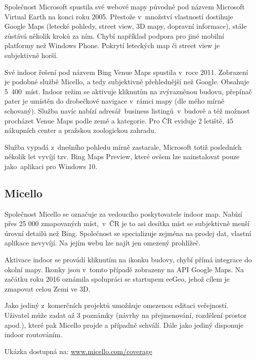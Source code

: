 Společnost Microsoft spustila své webové mapy původně pod názvem Microsoft Virtual Earth na konci roku 2005. Přestože v~množství vlastností dostihuje Google Maps (letecké pohledy, street view, 3D mapy, dopravní informace), stále zůstává několik kroků za ním. Chybí například podpora pro jiné mobilní platformy než Windows Phone. Pokrytí leteckých map či street view je subjektivně horší.

Své indoor řešení pod názvem Bing Venue Maps spustila v~roce 2011. Zobrazení je podobné službě Micello, a tedy subjektivně přehlednější než Google. Obsahuje 5~400~míst. Indoor režim se aktivuje kliknutím na zvýrazněnou budovu, přepínač pater je umístěn do drobečkové navigace v~rámci mapy (dle mého mírně schovaný). Služba navíc nabízí adresář~business listingů~v~budově a též možnost procházet Venue Maps podle země a kategorie. Pro ČR eviduje 2 letiště, 45 nákupních center a pražskou zoologickou zahradu.

Služba vypadá z~dnešního pohledu mírně zastarale, Microsoft totiž posledních několik let vyvíjí tzv. Bing Maps Preview, které ovšem lze nainstalovat pouze jako~aplikaci pro Windows 10.

\subsection{Micello}\label{micello}

Společnost Micello se označuje za vedoucího poskytovatele indoor map. Nabízí přes 25 000 zmapovaných míst,\cite{zdroj21}~v~ČR je to asi desítka míst se subjektivně menší úrovní detailů než Bing. Společnost se specializuje zejména na prodej dat, vlastní aplikace nevyvíjí. Na jejím webu lze najít jen omezený prohlížeč.

Aktivace indoor se provádí kliknutím na ikonku budovy, chybí přímá integrace do okolní mapy. Ikonky jsou v~tomto případě zobrazeny na API Google Maps. Na začátku roku 2016 oznámila spolupráci se startupem eeGeo, jehož cílem je zmapovat celou Zemi ve 3D.\cite{zdroj22}

Jako jediný z~komerčních projektů umožňuje omezenou editaci veřejností. Uživatel může zadat až 3 poznámky (návrhy na přejmenování, rozdělení prostor apod.), které pak Micello projde a případně schválí. Dále jako jediný disponuje indoor routováním.

Ukázka dostupná na: \href{http://www.micello.com/coverage}{www.micello.com/coverage}~


